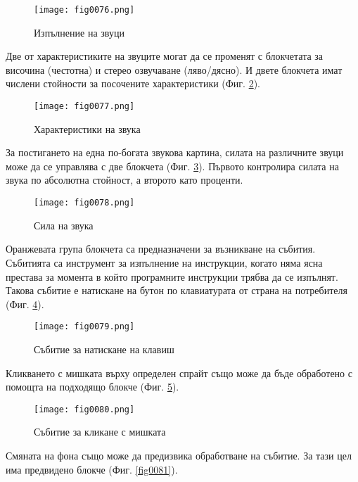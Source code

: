 \begin{figure}[H]
  \centering
  \texttt{[image: fig0076.png]}
  \caption{Изпълнение на звуци}
\label{fig0076}
\end{figure}

Две от характеристиките на звуците могат да се променят с блокчетата за височина (честотна) и стерео озвучаване (ляво/дясно). И двете блокчета имат числени стойности за посочените характеристики (Фиг. \ref{fig0077}).

\begin{figure}[H]
  \centering
  \texttt{[image: fig0077.png]}
  \caption{Характеристики на звука}
\label{fig0077}
\end{figure}

За постигането на една по-богата звукова картина, силата на различните звуци може да се управлява с две блокчета (Фиг. \ref{fig0078}). Първото контролира силата на звука по абсолютна стойност, а второто като проценти. 

\begin{figure}[H]
  \centering
  \texttt{[image: fig0078.png]}
  \caption{Сила на звука}
\label{fig0078}
\end{figure}

Оранжевата група блокчета са предназначени за възникване на събития. Събитията са инструмент за изпълнение на инструкции, когато няма ясна престава за момента в който програмните инструкции трябва да се изпълнят. Такова събитие е натискане на бутон по клавиатурата от страна на потребителя (Фиг. \ref{fig0079}).

\begin{figure}[H]
  \centering
  \texttt{[image: fig0079.png]}
  \caption{Събитие за натискане на клавиш}
\label{fig0079}
\end{figure}

Кликването с мишката върху определен спрайт също може да бъде обработено с помощта на подходящо блокче (Фиг. \ref{fig0080}).

\begin{figure}[H]
  \centering
  \texttt{[image: fig0080.png]}
  \caption{Събитие за кликане с мишката}
\label{fig0080}
\end{figure}

Смяната на фона също може да предизвика обработване на събитие. За тази цел има предвидено блокче (Фиг. \ref{fig0081}).


